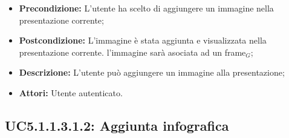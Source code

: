 \begin{itemize}
	\item \textbf{Precondizione:} L'utente ha scelto di aggiungere un immagine nella presentazione corrente;
	\item \textbf{Postcondizione:} L'immagine è stata aggiunta e visualizzata nella presentazione corrente. l'immagine sarà asociata ad un frame$_G$;
	\item \textbf{Descrizione:} L'utente può aggiungere un immagine alla presentazione;
	\item \textbf{Attori:} Utente autenticato.
\end{itemize}
\subsection{ UC5.1.1.3.1.2: Aggiunta infografica}

